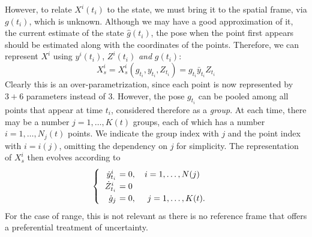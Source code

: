\documentclass[]{article}
\begin{document}
However, to relate $X^i(t_i)$ to the state, we must bring it to the spatial frame, via $g(t_i)$, which is unknown. Although we may have a good approximation of it, the current estimate of the state $\hat g(t_i)$, the pose when the point first appears should be estimated along with the coordinates of the points. Therefore, we can represent $X^i$ using $y^i(t_i)$, $Z^i(t_i)$ {\em and} $g(t_i)$: 
\begin{equation}
X_s^i = X_s^i(g_{t_i}, y_{t_i}, Z_{t_i}) = g_{t_i} \bar y_{t_i} Z_{t_i}
\end{equation}
Clearly this is an over-parametrization, since each point is now represented by $3+6$ parameters instead of $3$. However, the pose $g_{t_i}$ can be pooled among all points that appear at time $t_i$, considered therefore as a {\em group}. At each time, there may be a number $j = 1, \dots, K(t)$ groups, each of which has a number $i = 1, \dots, N_j(t)$ points. We indicate the group index with $j$ and the point index with $i = i(j)$, omitting the dependency on $j$ for simplicity. The representation of $X_s^i$ then evolves according to
\begin{equation}
\begin{cases}
\begin{tabular}{>{$}r<{$} >{$\!\!\!\!\!}l<{$}}
\dot y^i_{t_i} &= 0, ~~~ i = 1, \dots, N(j) \\
\dot Z^i_{t_i} &= 0 \\
\dot g_{j} &= 0, ~~~~ j = 1, \dots, K(t).
\end{tabular}
\end{cases}
\end{equation}
For the case of range, this is not relevant as there is no reference frame that offers a preferential treatment of uncertainty.
\end{document}
